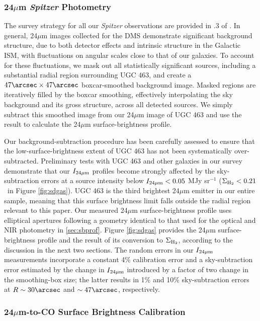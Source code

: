 \documentclass[apj,iop,numberedappendix]{emulateapj}
\begin{document}
\subsubsection{24$\mu$m {\it Spitzer} Photometry}
\label{sec:24phot}

The survey strategy for all our {\it Spitzer} observations are provided in .3 of .  In general, 24$\mu$m images
collected for the DMS demonstrate significant background structure, due to both
detector effects and intrinsic structure in the Galactic ISM, with fluctuations
on angular scales close to that of our galaxies.  To account for these
fluctuations, we mask out all statistically significant sources, including a
substantial radial region surrounding UGC 463, and create a
$47\arcsec\times47\arcsec$ boxcar-smoothed background image.  Masked regions are
iteratively filled by the boxcar smoothing, effectively interpolating the sky
background and its gross structure, across all detected sources.  We simply
subtract this smoothed image from our 24$\mu$m image of UGC 463 and use the
result to calculate the 24$\mu$m surface-brightness profile.

Our background-subtraction procedure has been carefully assessed to ensure that
the low-surface-brightness extent of UGC 463 has not been systematically
over-subtracted.  Preliminary tests with UGC 463 and other galaxies in our
survey demonstrate that our $I_{24\mu{\rm m}}$ profiles become strongly affected by the
sky-subtraction errors at a source intensity below $I_{24\mu{\rm m}} < 0.05$ MJy sr$^{-1}$
($\Sigma_{\rm H_2} < 0.21$ \sdu\ in Figure \ref{fig:sdgas}).  UGC 463 is the third
brightest 24$\mu$m emitter in our entire sample, meaning that this surface
brightness limit falls outside the radial region relevant to this paper.  Our
measured 24$\mu$m surface-brightness profile uses elliptical apertures following
a geometry identical to that used for the optical and NIR photometry in \sect
\ref{sec:sbprof}.  Figure \ref{fig:sdgas} provides the 24$\mu$m
surface-brightness profile and the result of its conversion to $\Sigma_{\rm H_2}$,
according to the discussion in the next two sections.  The random errors in our
$I_{24\mu{\rm m}}$ measurements incorporate a constant 4\% calibration error
\citep{2007PASP..119..994E} and a sky-subtraction error estimated by the change
in $I_{24\mu{\rm m}}$ introduced by a factor of two change in the smoothing-box size; the
latter results in 1\% and 10\% sky-subtraction errors at $R\sim30\arcsec$ and
$\sim47\arcsec$, respectively.  

\subsubsection{24$\mu$m-to-CO Surface Brightness Calibration}
\label{sec:spitztoco}
\end{document}
